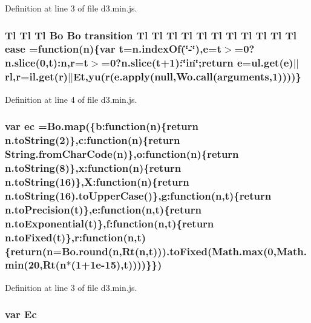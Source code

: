 Definition at line 3 of file d3.\+min.\+js.

\subsubsection[{ease}]{ {\bf Tl} {\bf Tl} {\bf Tl} {\bf Bo} {\bf Bo} {\bf transition} {\bf Tl} {\bf Tl} {\bf Tl} {\bf Tl} {\bf Tl} {\bf Tl} {\bf Tl} {\bf Tl} {\bf Tl} {\bf Tl} {\bf Tl} ease =function({\bf n})\{var t=n.\+index\+Of(\char`\"{}-\/\char`\"{}),{\bf e}=t$>$=0?n.\+slice(0,t)\+:{\bf n},{\bf r}=t$>$=0?n.\+slice(t+1)\+:\char`\"{}in\char`\"{};return {\bf e}=ul.\+get({\bf e})$\vert$$\vert${\bf rl},{\bf r}=il.\+get({\bf r})$\vert$$\vert$Et,{\bf yu}({\bf r}(e.\+apply(null,{\bf Wo.\+call}(arguments,1))))\}}\label{d3_8min_8js_a5d69de21ac395da51e485528f78ee99f}


Definition at line 4 of file d3.\+min.\+js.

\subsubsection[{ec}]{\setlength{\rightskip}{0pt plus 5cm}var ec ={\bf Bo.\+map}(\{b\+:function({\bf n})\{{\bf return} {\bf n.\+to\+String}(2)\},c\+:function({\bf n})\{{\bf return} String.\+from\+Char\+Code({\bf n})\},o\+:function({\bf n})\{{\bf return} {\bf n.\+to\+String}(8)\},x\+:function({\bf n})\{{\bf return} {\bf n.\+to\+String}(16)\},X\+:function({\bf n})\{{\bf return} {\bf n.\+to\+String}(16).to\+Upper\+Case()\},g\+:function({\bf n},t)\{{\bf return} n.\+to\+Precision(t)\},e\+:function({\bf n},t)\{{\bf return} n.\+to\+Exponential(t)\},f\+:function({\bf n},t)\{{\bf return} n.\+to\+Fixed(t)\},r\+:function({\bf n},t)\{{\bf return}({\bf n}={\bf Bo.\+round}({\bf n},Rt({\bf n},t))).to\+Fixed({\bf Math.\+max}(0,{\bf Math.\+min}(20,Rt({\bf n}$\ast$(1+1e-\/15),t))))\}\})}\label{d3_8min_8js_a2b1508e6563a51c4f7bf0afd324e4712}


Definition at line 3 of file d3.\+min.\+js.

\subsubsection[{Ec}]{\setlength{\rightskip}{0pt plus 5cm}var Ec}\label{d3_8min_8js_a0b85edf177dfa6bd331f14cb28f6c4d2}


